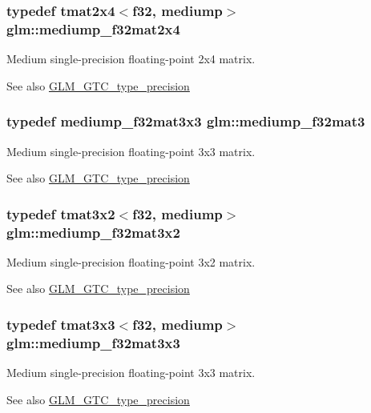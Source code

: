 \subsubsection[{mediump\+\_\+f32mat2x4}]{\setlength{\rightskip}{0pt plus 5cm}typedef tmat2x4$<${\bf f32}, mediump$>$ {\bf glm\+::mediump\+\_\+f32mat2x4}}\label{namespaceglm_ad26c2567ad37745ea5535bb0f312e254}
Medium single-\/precision floating-\/point 2x4 matrix. \begin{DoxySeeAlso}{See also}
\hyperlink{group__gtc__type__precision}{G\+L\+M\+\_\+\+G\+T\+C\+\_\+type\+\_\+precision} 
\end{DoxySeeAlso}
\hypertarget{namespaceglm_ae263a08ef179894fdd36f9a51698c4ab}{}
\subsubsection[{mediump\+\_\+f32mat3}]{\setlength{\rightskip}{0pt plus 5cm}typedef {\bf mediump\+\_\+f32mat3x3} {\bf glm\+::mediump\+\_\+f32mat3}}\label{namespaceglm_ae263a08ef179894fdd36f9a51698c4ab}
Medium single-\/precision floating-\/point 3x3 matrix. \begin{DoxySeeAlso}{See also}
\hyperlink{group__gtc__type__precision}{G\+L\+M\+\_\+\+G\+T\+C\+\_\+type\+\_\+precision} 
\end{DoxySeeAlso}
\hypertarget{namespaceglm_a6fcf8d00a3e0cca23e3eaaba24bf2dc3}{}
\subsubsection[{mediump\+\_\+f32mat3x2}]{\setlength{\rightskip}{0pt plus 5cm}typedef tmat3x2$<${\bf f32}, mediump$>$ {\bf glm\+::mediump\+\_\+f32mat3x2}}\label{namespaceglm_a6fcf8d00a3e0cca23e3eaaba24bf2dc3}
Medium single-\/precision floating-\/point 3x2 matrix. \begin{DoxySeeAlso}{See also}
\hyperlink{group__gtc__type__precision}{G\+L\+M\+\_\+\+G\+T\+C\+\_\+type\+\_\+precision} 
\end{DoxySeeAlso}
\hypertarget{namespaceglm_a40d94024c0ce48a6819a25d16a7955b7}{}
\subsubsection[{mediump\+\_\+f32mat3x3}]{\setlength{\rightskip}{0pt plus 5cm}typedef tmat3x3$<${\bf f32}, mediump$>$ {\bf glm\+::mediump\+\_\+f32mat3x3}}\label{namespaceglm_a40d94024c0ce48a6819a25d16a7955b7}
Medium single-\/precision floating-\/point 3x3 matrix. \begin{DoxySeeAlso}{See also}
\hyperlink{group__gtc__type__precision}{G\+L\+M\+\_\+\+G\+T\+C\+\_\+type\+\_\+precision} 
\end{DoxySeeAlso}
\hypertarget{namespaceglm_a18d2daa4d554564626732c485bab6cff}{}
